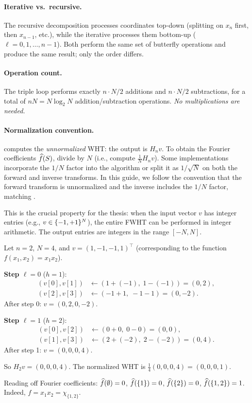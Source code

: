 \paragraph{Iterative vs.\ recursive.}
The recursive decomposition processes coordinates top-down (splitting on
$x_n$ first, then $x_{n-1}$, etc.), while the iterative
 processes them bottom-up ($\ell = 0, 1, \ldots, n-1$).
Both perform the same set of butterfly operations and produce the same
result; only the order differs.

\paragraph{Operation count.}
The triple loop performs exactly $n \cdot N/2$ additions and
$n \cdot N/2$ subtractions, for a total of $nN = N \log_2 N$ addition/subtraction
operations. \emph{No multiplications are needed.}

\paragraph{Normalization convention.}
 computes the \emph{unnormalized} WHT: the output is
$H_n v$. To obtain the Fourier coefficients $\widehat{f}(S)$, divide by $N$
(i.e., compute $\frac{1}{N} H_n v$). Some implementations incorporate
the $1/N$ factor into the algorithm or split it as $1/\sqrt{N}$ on both
the forward and inverse transforms. In this guide, we follow the
convention that the forward transform is unnormalized and the inverse
includes the $1/N$ factor, matching .

This is the crucial property for the thesis: when the input vector $v$
has integer entries (e.g., $v \in \{-1,+1\}^N$), the entire FWHT can be
performed in integer arithmetic. The output entries are integers in
the range $[-N, N]$.

\begin{example}\label{ex:fwht}
Let $n = 2$, $N = 4$, and $v = (1, -1, -1, 1)^\top$
(corresponding to the function $f(x_1, x_2) = x_1 x_2$).

\textbf{Step $\ell = 0$} ($h = 1$):
\begin{align*}
  (v[0], v[1]) &\gets (1 + (-1),\; 1 - (-1)) = (0, 2), \\
  (v[2], v[3]) &\gets (-1 + 1,\; -1 - 1) = (0, -2).
\end{align*}
After step 0: $v = (0, 2, 0, -2)$.

\textbf{Step $\ell = 1$} ($h = 2$):
\begin{align*}
  (v[0], v[2]) &\gets (0 + 0,\; 0 - 0) = (0, 0), \\
  (v[1], v[3]) &\gets (2 + (-2),\; 2 - (-2)) = (0, 4).
\end{align*}
After step 1: $v = (0, 0, 0, 4)$.

So $H_2 v = (0, 0, 0, 4)$. The normalized WHT is
$\frac{1}{4}(0, 0, 0, 4) = (0, 0, 0, 1)$.

Reading off Fourier coefficients: $\widehat{f}(\emptyset) = 0$,
$\widehat{f}(\{1\}) = 0$, $\widehat{f}(\{2\}) = 0$, $\widehat{f}(\{1,2\}) = 1$.
Indeed, $f = x_1 x_2 = \chi_{\{1,2\}}$. \checkmark
\end{example}


